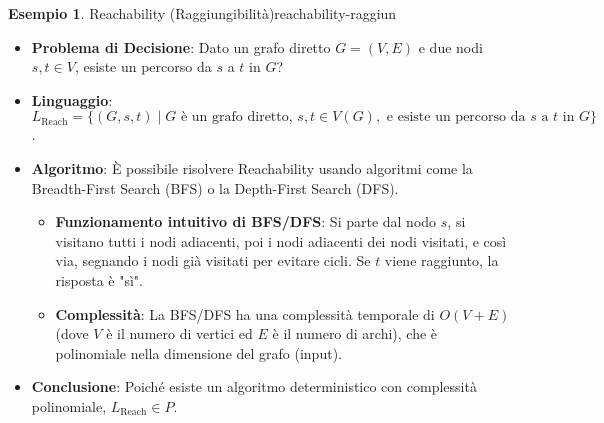 \documentclass[a4paper]{article}
\theoremstyle{definition} %
\newtheorem{example}{Esempio}[section]
\begin{document}
\begin{example}{Reachability (Raggiungibilità)}{reachability-raggiun}
\begin{itemize}
    \item \textbf{Problema di Decisione}: Dato un grafo diretto $G=(V, E)$ e due nodi $s, t \in V$, esiste un percorso da $s$ a $t$ in $G$?
    \item \textbf{Linguaggio}: $L_{\text{Reach}} = \{ (G, s, t) \mid G \text{ è un grafo diretto, } s, t \in V(G), \text{ e esiste un percorso da } s \text{ a } t \text{ in } G \}$.
    \item \textbf{Algoritmo}: È possibile risolvere Reachability usando algoritmi come la Breadth-First Search (BFS) o la Depth-First Search (DFS).
        \begin{itemize}
            \item \textbf{Funzionamento intuitivo di BFS/DFS}: Si parte dal nodo $s$, si visitano tutti i nodi adiacenti, poi i nodi adiacenti dei nodi visitati, e così via, segnando i nodi già visitati per evitare cicli. Se $t$ viene raggiunto, la risposta è "sì".
            \item \textbf{Complessità}: La BFS/DFS ha una complessità temporale di $O(V+E)$ (dove $V$ è il numero di vertici ed $E$ è il numero di archi), che è polinomiale nella dimensione del grafo (input).
        \end{itemize}
    \item \textbf{Conclusione}: Poiché esiste un algoritmo deterministico con complessità polinomiale, $L_{\text{Reach}} \in P$.
\end{itemize}
\end{example}
\end{document}
